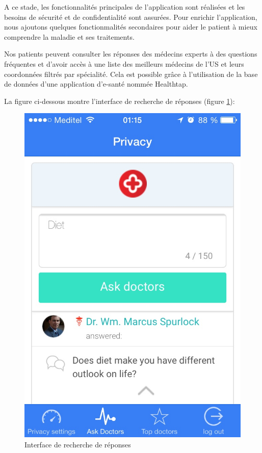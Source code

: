 A ce stade, les fonctionnalités principales de l'application sont réalisées et les besoins de sécurité et de confidentialité sont assurées. Pour enrichir l'application, nous ajoutons quelques fonctionmalités secondaires pour aider le patient à mieux comprendre la maladie et ses traitements.

\vspace{6pt}
\paragraphmark

Nos patients peuvent consulter les réponses des médecins experts à des questions fréquentes et d’avoir accès à une liste des meilleurs médecins de l’US et leurs coordonnées filtrés par spécialité. Cela est possible grâce à l'utilisation de la base de données d’une application d'e-santé nommée Healthtap.

\vspace{6pt}
\paragraphmark

La figure ci-dessous montre l’interface de recherche de réponses (figure \ref{rep}):

\begin{figure}[!ht]
\begin{center}
\includegraphics[scale=0.4]{rep.jpg}
\caption{Interface de recherche de réponses}
\label{rep}
\end{center}
\end{figure}

